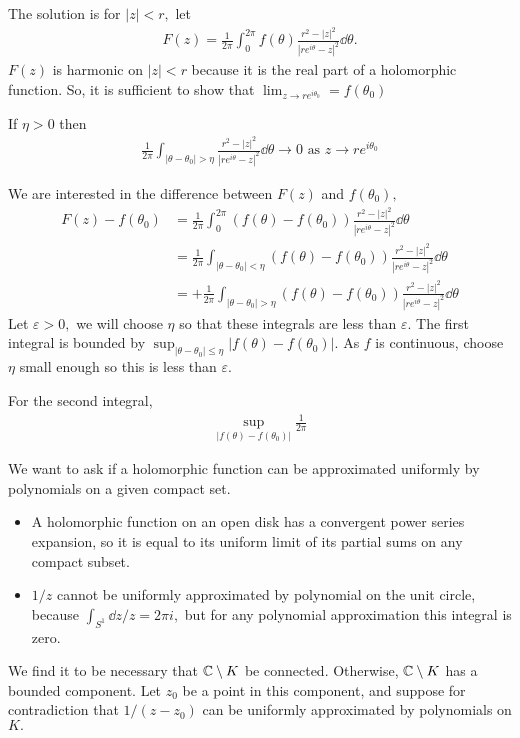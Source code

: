 \documentclass[a4paper,12pt]{article}
\begin{document}
The solution is for $|z|<r,$ let \begin{align}
    F(z)=\frac{1}{2\pi}\int_0^{2\pi}f(\theta)\frac{r^2-|z|^2}{|re^{i\theta}-z|^2}\dd\theta.
\end{align}
$F(z)$ is harmonic on $|z|<r$ because it is the real part of a holomorphic function. So, it is sufficient to show that $\displaystyle{\lim_{z\to re^{i\theta_0}}}=f(\theta_0)$
\begin{lemma}
    If $\eta>0$ then \begin{align}
        \frac{1}{2\pi}\int_{|\theta-\theta_0|>\eta}\frac{r^2-|z|^2}{|re^{i\theta}-z|^2}\dd\theta\to0\text{ as }z\to re^{i\theta_0}
    \end{align}
\end{lemma}
We are interested in the difference between $F(z)$ and $f(\theta_0),$ \begin{align}
    F(z)-f(\theta_0)&=\frac{1}{2\pi}\int_0^{2\pi}(f(\theta)-f(\theta_0))\frac{r^2-|z|^2}{|re^{i\theta}-z|^2}\dd\theta\\
    &=\frac{1}{2\pi}\int_{|\theta-\theta_0|<\eta}(f(\theta)-f(\theta_0))\frac{r^2-|z|^2}{|re^{i\theta}-z|^2}\dd\theta\\
    &=+\frac{1}{2\pi}\int_{|\theta-\theta_0|>\eta}(f(\theta)-f(\theta_0))\frac{r^2-|z|^2}{|re^{i\theta}-z|^2}\dd\theta
\end{align}
Let $\varepsilon>0,$ we will choose $\eta$ so that these integrals are less than $\varepsilon.$ The first integral is bounded by $\sup_{|\theta-\theta_0|\leq\eta}|f(\theta)-f(\theta_0)|.$ As $f$ is continuous, choose $\eta$ small enough so this is less than $\varepsilon.$

For the second integral, \begin{align}
    \sup_{|f(\theta)-f(\theta_0)|}\frac{1}{2\pi}
\end{align}

We want to ask if a holomorphic function can be approximated uniformly by polynomials on a given compact set. 
\begin{itemize}
    \item A holomorphic function on an open disk has a convergent power series expansion, so it is equal to its uniform limit of its partial sums on any compact subset.
    \item $1/z$ cannot be uniformly approximated by polynomial on the unit circle, because $\int_{S^1}\dd z/z=2\pi i,$ but for any polynomial approximation this integral is zero.
\end{itemize}
We find it to be necessary that $\mathbb{C}\setminus K$ be connected. Otherwise, $\mathbb{C}\setminus K$ has a bounded component. Let $z_0$ be a point in this component, and suppose for contradiction that $1/(z-z_0)$ can be uniformly approximated by polynomials on $K.$
\end{document}
